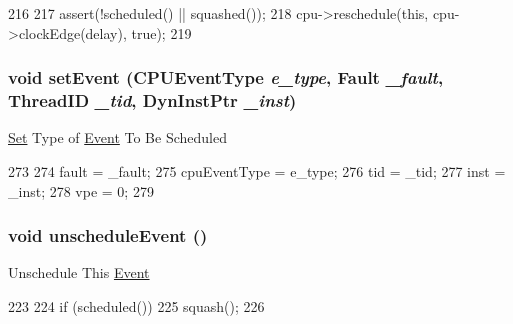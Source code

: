 \begin{DoxyCode}
216 {
217     assert(!scheduled() || squashed());
218     cpu->reschedule(this, cpu->clockEdge(delay), true);
219 }
\end{DoxyCode}
\hypertarget{classInOrderCPU_1_1CPUEvent_a8f450de378476d87c71f9a3790d68c02}{
\subsubsection[{setEvent}]{\setlength{\rightskip}{0pt plus 5cm}void setEvent ({\bf CPUEventType} {\em e\_\-type}, \/  {\bf Fault} {\em \_\-fault}, \/  {\bf ThreadID} {\em \_\-tid}, \/  {\bf DynInstPtr} {\em \_\-inst})}}
\label{classInOrderCPU_1_1CPUEvent_a8f450de378476d87c71f9a3790d68c02}
\hyperlink{classSet}{Set} Type of \hyperlink{classEvent}{Event} To Be Scheduled 


\begin{DoxyCode}
273         {
274             fault = _fault;
275             cpuEventType = e_type;
276             tid = _tid;
277             inst = _inst;
278             vpe = 0;            
279         }
\end{DoxyCode}
\hypertarget{classInOrderCPU_1_1CPUEvent_a8521a64adc8d310754330bc7dfe48831}{
\subsubsection[{unscheduleEvent}]{\setlength{\rightskip}{0pt plus 5cm}void unscheduleEvent ()}}
\label{classInOrderCPU_1_1CPUEvent_a8521a64adc8d310754330bc7dfe48831}
Unschedule This \hyperlink{classEvent}{Event} 


\begin{DoxyCode}
223 {
224     if (scheduled())
225         squash();
226 }
\end{DoxyCode}


